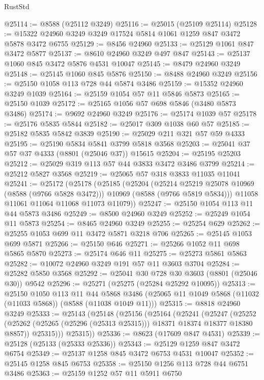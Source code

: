 \begin{lexlean}{RustStd}
\begin{coremodule}
@25114 := @8588 (@25112 @3249)
@25116 := @25015 (@25109 @25114)
@25128 := @15322 @24960 @3249 @3249 @17524 @5814 @1061 @1259 @847 @3472 @5878 @3472 @6755
@25129 := @8456 @24960
@25133 := @25129 @1061 @847 @3472 @5877
@25137 := @8610 @24960 @3249 @497 @847
@25143 := @25137 @1060 @845 @3472 @5876 @4531 @10047
@25145 := @8479 @24960 @3249
@25148 := @25145 @1060 @845 @5876
@25150 := @8488 @24960 @3249
@25156 := @25150 @1058 @113 @728 @44 @5874 @3486
@25159 := @15352 @24960 @3249 @1039
@25164 := @25159 @1054 @57 @11 @5846 @5873
@25165 := @25150 @1039
@25172 := @25165 @1056 @57 @698 @5846 (@3480 @5873 @3486)
@25174 := @9692 @24960 @3249
@25176 := @25174 @1039 @57
@25178 := @25176 @5835 @5844
@25182 := @25017 @309 @1038 @60 @57
@25185 := @25182 @5835 @5842 @3839
@25190 := @25029 @211 @321 @57 @59 @4333
@25195 := @25190 @5834 @5841 @3799 @5818 @3568
@25203 := @25041 @37 @57 @37 @4333 (@8801 (@25046 @37)) @15615
@25204 := @25195 @25203
@25212 := @25029 @319 @113 @57 @44 @3833 @3472 @3486 @3799
@25214 := @25212 @5827 @3568
@25219 := @25065 @57 @318 @3833 @11035 @11041
@25241 := @25172
    (@25178
      (@25185
        (@25204
          (@25214 @25219 @25078 @10969 (@8588 (@9766 @5828 @3472)))
          @10969
          (@8588 (@9766 @5819 @5834)))
        @11058
        @11061
        @11064
        @11068
        @11073
        @11079))
@25247 := @25150 @1054 @113 @11 @44 @5873 @3486
@25249 := @8500 @24960 @3249
@25252 := @25249 @1054 @11 @5873
@25254 := @8465 @24960 @3249
@25255 := @25254 @629
@25262 := @25255 @1053 @699 @11 @3472 @5871 @3218 @706
@25265 := @25145 @1053 @699 @5871
@25266 := @25150 @646
@25271 := @25266 @1052 @11 @698 @5865 @5870
@25273 := @25174 @646 @11
@25275 := @25273 @5861 @5863
@25282 := @10072 @24960 @3249 @191 @57 @11 @3603 @3704
@25284 := @25282 @5850 @3568
@25292 := @25041 @30 @728 @30 @3603 (@8801 (@25046 @30)) @9542
@25296 := @25271 (@25275 (@25284 @25292 @10095))
@25313 := @25150
    @1050
    @113
    @11
    @44
    @5868
    @3486
    (@25065 @11 @1049 @5868 (@11032 (@11033 @5868)) (@8588 (@11038 @1049 @11)))
@25315 := @8818 @24960 @3249
@25333 := @25143
    (@25148
      (@25156
        (@25164
          (@25241
            (@25247
              (@25252 (@25262 (@25265 (@25296 (@25313 @25315))) @18371 @18374 @18377 @18380 @8857))
              @25315)))
        @25315))
@25336 := @8623 (@17609 @847 @4531)
@25339 := @25128 (@25133 (@25333 @25336))
@25343 := @25129 @1259 @847 @3472 @6754
@25349 := @25137 @1258 @845 @3472 @6753 @4531 @10047
@25352 := @25145 @1258 @845 @6753
@25358 := @25150 @1256 @113 @728 @44 @6751 @3486
@25363 := @25159 @1252 @57 @11 @5911 @6750

\end{coremodule}
\end{lexlean}
